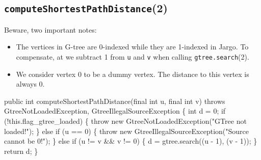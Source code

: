 \documentclass{article}
\def\nwendcode{\endtrivlist \endgroup}      %
\let\nwdocspar=\par
\begin{document}
\subsection{{\tt{}\protect{}computeShortestPathDistance}(2)}
Beware, two important notes:
\begin{itemize}
\item The vertices in G-tree are 0-indexed while they are 1-indexed in Jargo.
To compensate, at we subtract 1 from {\tt{}u} and {\tt{}v} when calling
{\tt{}\protect{}gtree.search}(2).
\item We consider vertex 0 to be a dummy vertex. The distance to this vertex
is always 0.
\end{itemize}
\nwenddocs{}\endmoddef{}
public int computeShortestPathDistance(final int u, final int v)
throws GtreeNotLoadedException, GtreeIllegalSourceException \{
  int d = 0;
  if (!this.flag_gtree_loaded) \{
    throw new GtreeNotLoadedException("GTree not loaded!");
  \} else if (u == 0) \{
    throw new GtreeIllegalSourceException("Source cannot be 0!");
  \} else if (u != v && v != 0) \{
    d = gtree.search((u - 1), (v - 1));
  \}
  return d;
\}
\eatline
{}\nwendcode{}\nwdocspar
\end{document}
